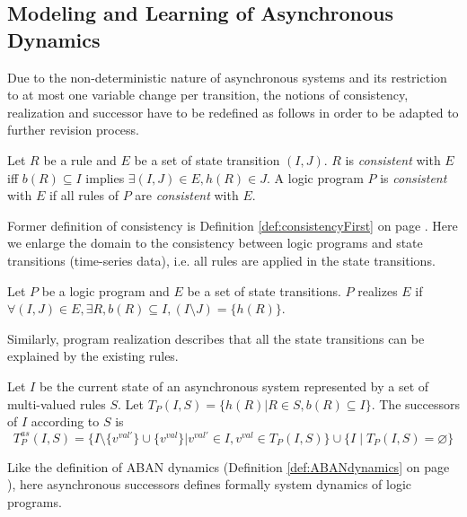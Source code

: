 \subsection{Modeling and Learning of Asynchronous Dynamics}\label{sec:alfit}

Due to the non-deterministic nature of asynchronous systems and its restriction to at most one variable change per transition,
the notions of consistency, realization and successor have to be redefined as follows in order to be adapted to further revision process.

\begin{definition}[Consistency]\label{def:consistencySecond}
	Let $R$ be a rule and $E$ be a set of state transition $(I,J)$.
	$R$ is {\it consistent} with $E$ iff
	$b(R)\subseteq I$ implies $\exists (I,J) \in E, h(R) \in J$.
	A logic program $P$ is {\it consistent} with $E$ if all rules of $P$ are {\it consistent} with $E$.
\end{definition}

Former definition of consistency is Definition \ref{def:consistencyFirst} on page \pageref{def:consistencyFirst}.
Here we enlarge the domain to the consistency between logic programs and state transitions (time-series data), i.e. all rules are applied in the state transitions. 

\begin{definition}
	Let $P$ be a logic program and $E$ be a set of state transitions.
	$P$ realizes $E$ if $\forall (I,J) \in E, \exists R, b(R) \subseteq I, (I \setminus J) = \{h(R)\}$.
\end{definition}

Similarly, program realization describes that all the state transitions can be explained by the existing rules.

\begin{definition}
	Let $I$ be the current state of an asynchronous system represented by a set of multi-valued rules $S$.
	Let $T_P(I,S) = \{h(R) | R \in S, b(R) \subseteq I\}$.
	The successors of $I$ according to $S$ is
	$$T_P^{as}(I,S) = \{I \setminus \{v^{val'}\} \cup \{v^{val}\} | v^{val'} \in I, v^{val} \in T_P(I,S)\} \cup \{I \mid T_P(I,S) = \varnothing\}$$ %
\end{definition}

Like the definition of ABAN dynamics (Definition \ref{def:ABANdynamics} on page \pageref{def:ABANdynamics}), here asynchronous successors defines formally system dynamics of logic programs.

